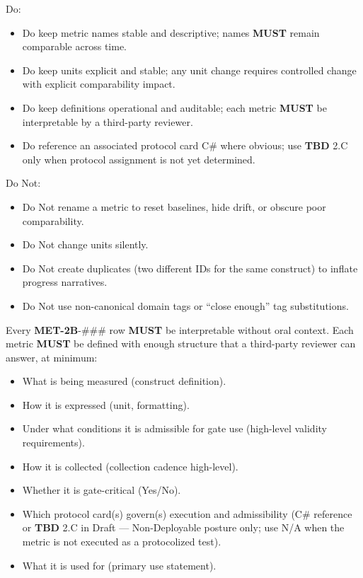 \documentclass[10pt]{article}
\begin{document}
Do:

\begin{itemize}
\item Do keep metric names stable and descriptive; names \textbf{MUST} remain comparable across time.
\item Do keep units explicit and stable; any unit change requires controlled change with explicit comparability impact.
\item Do keep definitions operational and auditable; each metric \textbf{MUST} be interpretable by a third-party reviewer.
\item Do reference an associated protocol card C\# where obvious; use \textbf{TBD} 2.C only when protocol assignment is not yet determined.
\end{itemize}

Do Not:

\begin{itemize}
\item Do Not rename a metric to reset baselines, hide drift, or obscure poor comparability.
\item Do Not change units silently.
\item Do Not create duplicates (two different IDs for the same construct) to inflate progress narratives.
\item Do Not use non-canonical domain tags or “close enough” tag substitutions.
\end{itemize}

Every \textbf{MET-2B}-\#\#\# row \textbf{MUST} be interpretable without oral context. Each metric \textbf{MUST} be defined with enough structure that a third-party reviewer can answer, at minimum:

\begin{itemize}
\item What is being measured (construct definition).
\item How it is expressed (unit, formatting).
\item Under what conditions it is admissible for gate use (high-level validity requirements).
\item How it is collected (collection cadence high-level).
\item Whether it is gate-critical (Yes/No).
\item Which protocol card(s) govern(s) execution and admissibility (C\# reference or \textbf{TBD} 2.C in Draft — Non-Deployable posture only; use N/A when the metric is not executed as a protocolized test).
\item What it is used for (primary use statement).
\end{itemize}
\end{document}
